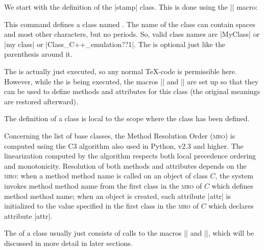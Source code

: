 We start with the definition of the |stamp| class. This is done using the
|\pgfooclass| macro:

\begin{command}{\pgfooclass{}}
    This command defines a class named . The name of the class
    can contain spaces and most other characters, but no periods. So, valid
    class names are |MyClass| or |my class| or |Class_C++_emulation??1|. The
     is optional just like the parenthesis around
    it.

    The  is actually just executed, so any normal \TeX-code is
    permissible here. However, while the  is being executed, the
    macros |\method| and |\attribute| are set up so that they can be used to
    define methods and attributes for this class (the original meanings are
    restored afterward).

    The definition of a class is local to the scope where the class has been
    defined.
\begin{codeexample}

\end{codeexample}

    Concerning the list of base classes, the Method Resolution Order
    (\textsc{mro}) is computed using the C3 algorithm also used in Python, v2.3
    and higher. The linearization computed by the algorithm respects both
    local precedence ordering and monotonicity. Resolution of both methods and
    attributes depends on the \textsc{mro}: when a method method name is called
    on an object of class $C$, the system invokes method method name from the
    first class in the \textsc{mro} of $C$ which defines method method name;
    when an object is created, each attribute |attr| is initialized to the
    value specified in the first class in the \textsc{mro} of $C$ which
    declares attribute |attr|.
\end{command}

The  of a class usually just consists of calls to the macros
|\attribute| and |\method|, which will be discussed in more detail in later
sections.


